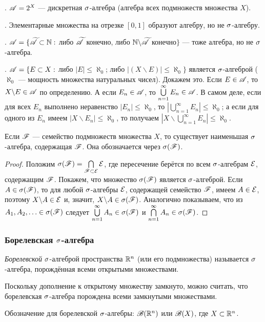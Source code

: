 \documentclass[10pt]{article}
\begin{document}
. $\mathscr{A}=2^X$ --- дискретная $\sigma$-алгебра (алгебра всех
подмножеств множества $X$).

. Элементарные множества на отрезке $[0,1]$ образуют алгебру,
но не $\sigma$-алгебру.

. $\mathscr{A}=\{\widetilde{\mathscr{A}}\subset\mathbb{N}:$ либо $\widetilde{\mathscr{A}}$
конечно, либо $\mathbb{N}\backslash\widetilde{\mathscr{A}}$ конечно$\}$ --- тоже
алгебра, но не $\sigma$-алгебра.

. $\mathscr{A}=\{E\subset X:$ либо $|E|\le\aleph_0$; либо
$|(X\backslash E)|\le\aleph_0\}$ является $\sigma$-алгеброй ($\aleph_0$
--- мощность множества натуральных чисел). Докажем это.
Если $E\in\mathscr{A}$, то $X\backslash E\in\mathscr{A}$ по определению. А если
$E_n\in\mathscr{A}$, то $\bigcup\limits_{n=1}^\infty E_n\in\mathscr{A}$. В самом
деле, если для всех $E_n$ выполнено неравенство $|E_n|\le\aleph_0$,
то $|\bigcup\limits_{n=1}^\infty E_n|\le\aleph_0$; а если для одного
из $E_n$ имеем $|X\backslash E_n|\le\aleph_0$, то получаем
$|X\backslash{\bigcup\limits_{n=1}^\infty E_n}|\le\aleph_0$.

\begin{theorem}
Если $\mathscr{F}$ --- семейство подмножеств множества $X$, то существует
наименьшая $\sigma$-алгебра, содержащая $\mathscr{F}$. Она обозначается через
$\sigma(\mathscr{F})$.
\end{theorem}

\begin{proof}
Положим $\sigma(\mathscr{F})=\bigcap\limits_{\mathscr{F}\subset\mathcal{E}}\mathcal{E}$, где
пересечение берётся по всем $\sigma$-алгебрам $\mathcal{E}$, содержащим $\mathscr{F}$.
Покажем, что множество $\sigma(\mathscr{F})$ является $\sigma$-алгеброй. Если
$A\in\sigma(\mathscr{F})$, то для любой $\sigma$-алгебры $\mathcal{E}$, содержащей
семейство $\mathscr{F}$, имеем $A\in\mathcal{E}$, поэтому $X\backslash A\in\mathcal{E}$ и,
значит, $X\backslash A\in\sigma(\mathscr{F})$. Аналогично показываем, что из
$A_1,A_2,\ldots\in\sigma(\mathscr{F})$ следует $\bigcup\limits_{n=1}^{\infty} A_n\in\sigma(\mathscr{F})$ и
$\bigcap\limits_{n=1}^{\infty} A_n\in\sigma(\mathscr{F})$.
\end{proof}

\subsubsection{Борелевская $\sigma$-алгебра}

\begin{df}
\emph{Борелевской} $\sigma$-алгеброй пространства $\mathbb{R}^n$ (или его
подмножества) называется $\sigma$-алгебра, порождённая всеми открытыми
множествами.
\end{df}

\begin{note}
Поскольку дополнение к открытому множеству замкнуто, можно считать,
что борелевская $\sigma$-алгебра порождена всеми замкнутыми
множествами.
\end{note}
Обозначение для борелевской $\sigma$-алгебры: $\mathscr{B}(\mathbb{R}^n)$ или $\mathscr{B}(X)$,
где $X\subset \mathbb{R}^n$.
\end{document}
